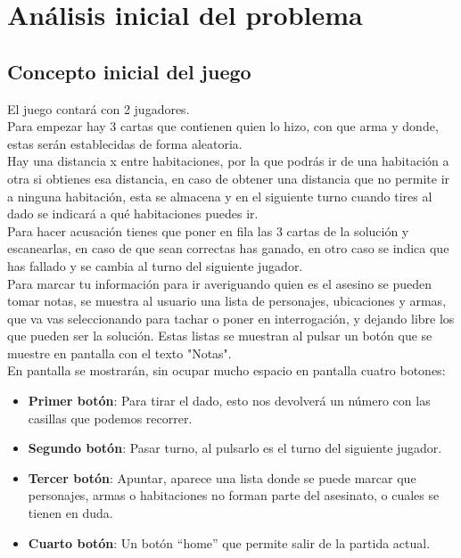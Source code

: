 \chapter{Análisis inicial del problema}
\label{ch:analisis}

\section{Concepto inicial del juego}
El juego contará con 2 jugadores.\\

Para empezar hay 3 cartas que contienen quien lo hizo, con que arma y donde, estas serán establecidas de forma aleatoria.\\

Hay una distancia x entre habitaciones, por la que podrás ir de una habitación a otra si obtienes esa distancia, en caso de obtener una distancia que no permite ir a ninguna habitación, esta se almacena y en el siguiente turno cuando tires al dado se indicará a qué habitaciones puedes ir.\\

Para hacer acusación tienes que poner en fila las 3 cartas de la solución y escanearlas, en caso de que sean correctas has ganado, en otro caso se indica que has fallado y se cambia al turno del siguiente jugador.\\

Para marcar tu información para ir averiguando quien es el asesino se pueden tomar notas, se muestra al usuario una lista de personajes, ubicaciones y armas, que va vas seleccionando para tachar o poner en interrogación, y dejando libre los que pueden ser la solución. Estas listas se muestran al pulsar un botón que se muestre en pantalla con el texto "Notas".\\

En pantalla se mostrarán, sin ocupar mucho espacio en pantalla cuatro botones:
\begin{itemize}
  \item \textbf{Primer botón}: Para tirar el dado, esto nos devolverá un número con las casillas que podemos recorrer.
  \item \textbf{Segundo botón}: Pasar turno, al pulsarlo es el turno del siguiente jugador.
  \item \textbf{Tercer botón}: Apuntar, aparece una lista donde se puede marcar que personajes, armas o habitaciones no forman parte del asesinato, o cuales se tienen en duda.
  \item \textbf{Cuarto botón}: Un botón “home” que permite salir de la partida actual.
\end{itemize}

